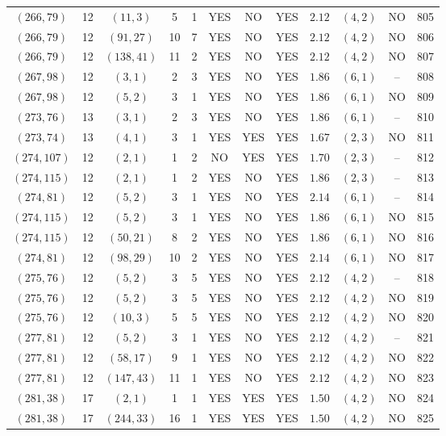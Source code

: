 \begin{longtable}{|c|c|c|c|c|c|c|c|c|c|c|c|}
$(266,79)$ & 12 & $(11,3)$ & 5 & 1 & YES & NO & YES & $2.12$ & $(4,2)$ & NO & 805\\
$(266,79)$ & 12 & $(91,27)$ & 10 & 7 & YES & NO & YES & $2.12$ & $(4,2)$ & NO & 806\\
$(266,79)$ & 12 & $(138,41)$ & 11 & 2 & YES & NO & YES & $2.12$ & $(4,2)$ & NO & 807\\
$(267,98)$ & 12 & $(3,1)$ & 2 & 3 & YES & NO & YES & $1.86$ & $(6,1)$ & -- & 808\\
$(267,98)$ & 12 & $(5,2)$ & 3 & 1 & YES & NO & YES & $1.86$ & $(6,1)$ & NO & 809\\
$(273,76)$ & 13 & $(3,1)$ & 2 & 3 & YES & NO & YES & $1.86$ & $(6,1)$ & -- & 810\\
$(273,74)$ & 13 & $(4,1)$ & 3 & 1 & YES & YES & YES & $1.67$ & $(2,3)$ & NO & 811\\
$(274,107)$ & 12 & $(2,1)$ & 1 & 2 & NO & YES & YES & $1.70$ & $(2,3)$ & -- & 812\\
$(274,115)$ & 12 & $(2,1)$ & 1 & 2 & YES & NO & YES & $1.86$ & $(2,3)$ & -- & 813\\
$(274,81)$ & 12 & $(5,2)$ & 3 & 1 & YES & NO & YES & $2.14$ & $(6,1)$ & -- & 814\\
$(274,115)$ & 12 & $(5,2)$ & 3 & 1 & YES & NO & YES & $1.86$ & $(6,1)$ & NO & 815\\
$(274,115)$ & 12 & $(50,21)$ & 8 & 2 & YES & NO & YES & $1.86$ & $(6,1)$ & NO & 816\\
$(274,81)$ & 12 & $(98,29)$ & 10 & 2 & YES & NO & YES & $2.14$ & $(6,1)$ & NO & 817\\
$(275,76)$ & 12 & $(5,2)$ & 3 & 5 & YES & NO & YES & $2.12$ & $(4,2)$ & -- & 818\\
$(275,76)$ & 12 & $(5,2)$ & 3 & 5 & YES & NO & YES & $2.12$ & $(4,2)$ & NO & 819\\
$(275,76)$ & 12 & $(10,3)$ & 5 & 5 & YES & NO & YES & $2.12$ & $(4,2)$ & NO & 820\\
$(277,81)$ & 12 & $(5,2)$ & 3 & 1 & YES & NO & YES & $2.12$ & $(4,2)$ & -- & 821\\
$(277,81)$ & 12 & $(58,17)$ & 9 & 1 & YES & NO & YES & $2.12$ & $(4,2)$ & NO & 822\\
$(277,81)$ & 12 & $(147,43)$ & 11 & 1 & YES & NO & YES & $2.12$ & $(4,2)$ & NO & 823\\
$(281,38)$ & 17 & $(2,1)$ & 1 & 1 & YES & YES & YES & $1.50$ & $(4,2)$ & NO & 824\\
$(281,38)$ & 17 & $(244,33)$ & 16 & 1 & YES & YES & YES & $1.50$ & $(4,2)$ & NO & 825\\

\end{longtable}
